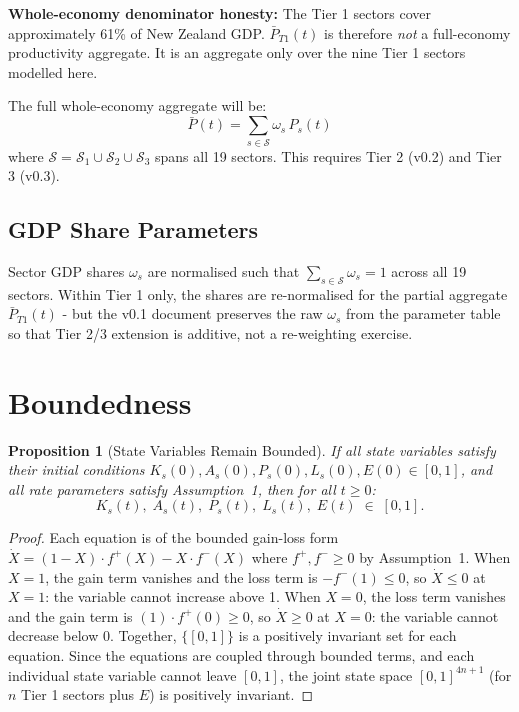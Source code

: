 \documentclass[11pt,a4paper]{article}
\newtheorem{proposition}{Proposition}
\begin{document}
\textbf{Whole-economy denominator honesty:} The Tier 1 sectors cover approximately 61\% of New Zealand GDP. $\bar{P}_{T1}(t)$ is therefore \emph{not} a full-economy productivity aggregate. It is an aggregate only over the nine Tier 1 sectors modelled here.

The full whole-economy aggregate will be:
\begin{equation}
\bar{P}(t) = \sum_{s \in \mathcal{S}} \omega_s\, P_s(t)
\end{equation}
where $\mathcal{S} = \mathcal{S}_1 \cup \mathcal{S}_2 \cup \mathcal{S}_3$ spans all 19 sectors. This requires Tier 2 (v0.2) and Tier 3 (v0.3).

\subsection{GDP Share Parameters}

Sector GDP shares $\omega_s$ are normalised such that $\sum_{s \in \mathcal{S}} \omega_s = 1$ across all 19 sectors. Within Tier 1 only, the shares are re-normalised for the partial aggregate $\bar{P}_{T1}(t)$ - but the v0.1 document preserves the raw $\omega_s$ from the parameter table so that Tier 2/3 extension is additive, not a re-weighting exercise.

\section{Boundedness}
\label{sec:boundedness}

\begin{proposition}[State Variables Remain Bounded]
If all state variables satisfy their initial conditions $K_s(0), A_s(0), P_s(0), L_s(0), E(0) \in [0,1]$, and all rate parameters satisfy Assumption~1, then for all $t \geq 0$:
\[
K_s(t),\; A_s(t),\; P_s(t),\; L_s(t),\; E(t) \;\in\; [0,1].
\]
\end{proposition}

\begin{proof}
Each equation is of the bounded gain-loss form $\dot{X} = (1-X)\cdot f^+(X) - X\cdot f^-(X)$ where $f^+, f^- \geq 0$ by Assumption~1. When $X = 1$, the gain term vanishes and the loss term is $-f^-(1) \leq 0$, so $\dot{X} \leq 0$ at $X = 1$: the variable cannot increase above 1. When $X = 0$, the loss term vanishes and the gain term is $(1)\cdot f^+(0) \geq 0$, so $\dot{X} \geq 0$ at $X = 0$: the variable cannot decrease below 0. Together, $\{[0,1]\}$ is a positively invariant set for each equation. Since the equations are coupled through bounded terms, and each individual state variable cannot leave $[0,1]$, the joint state space $[0,1]^{4n+1}$ (for $n$ Tier 1 sectors plus $E$) is positively invariant.
\end{proof}
\end{document}
